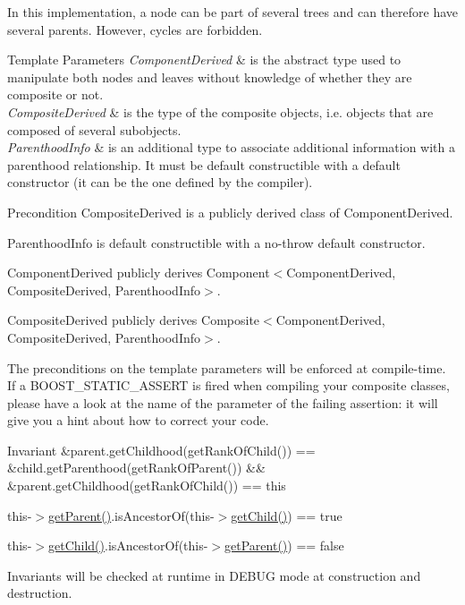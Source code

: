In this implementation, a node can be part of several trees and can therefore have several parents. However, cycles are forbidden.


\begin{DoxyTemplParams}{Template Parameters}
{\em Component\+Derived} & is the abstract type used to manipulate both nodes and leaves without knowledge of whether they are composite or not. \\
\hline
{\em Composite\+Derived} & is the type of the composite objects, i.\+e. objects that are composed of several subobjects. \\
\hline
{\em Parenthood\+Info} & is an additional type to associate additional information with a parenthood relationship. It must be default constructible with a default constructor (it can be the one defined by the compiler).\\
\hline
\end{DoxyTemplParams}
\begin{DoxyPrecond}{Precondition}
Composite\+Derived is a publicly derived class of Component\+Derived. 

Parenthood\+Info is default constructible with a no-\/throw default constructor. 

Component\+Derived publicly derives Component$<$\+Component\+Derived, Composite\+Derived, Parenthood\+Info$>$. 

Composite\+Derived publicly derives Composite$<$\+Component\+Derived, Composite\+Derived, Parenthood\+Info$>$.
\end{DoxyPrecond}
The preconditions on the template parameters will be enforced at compile-\/time. If a B\+O\+O\+S\+T\+\_\+\+S\+T\+A\+T\+I\+C\+\_\+\+A\+S\+S\+E\+RT is fired when compiling your composite classes, please have a look at the name of the parameter of the failing assertion\+: it will give you a hint about how to correct your code.

\begin{DoxyInvariant}{Invariant}
\&parent.\+get\+Childhood(get\+Rank\+Of\+Child()) == \&child.\+get\+Parenthood(get\+Rank\+Of\+Parent()) \&\& \&parent.\+get\+Childhood(get\+Rank\+Of\+Child()) == this 

this-\/$>$\hyperlink{classocra_1_1Parenthood_ac7e617fc08d7bed72fc6f90579b5cef7}{get\+Parent()}.is\+Ancestor\+Of(this-\/$>$\hyperlink{classocra_1_1Parenthood_a7056661e3f0e6500141d305e6397f7c0}{get\+Child()}) == true 

this-\/$>$\hyperlink{classocra_1_1Parenthood_a7056661e3f0e6500141d305e6397f7c0}{get\+Child()}.is\+Ancestor\+Of(this-\/$>$\hyperlink{classocra_1_1Parenthood_ac7e617fc08d7bed72fc6f90579b5cef7}{get\+Parent()}) == false
\end{DoxyInvariant}
Invariants will be checked at runtime in D\+E\+B\+UG mode at construction and destruction. 

